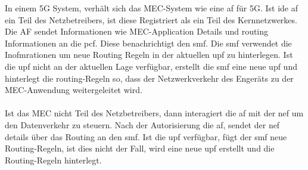 \documentclass[runningheads]{llncs}
\numberwithin{figure}{section}
\begin{document}
In einem 5G System, verhält sich das MEC-System wie eine \acrfull{af} für 5G. Ist ide \acrshort{af} ein Teil des Netzbetreibers, ist diese 
Registriert als ein Teil des Kernnetzwerkes. Die AF sendet Informationen wie MEC-Application Details und routing Informationen 
an die \acrshort{pcf}. Diese benachrichtigt den \acrshort{smf}. Die \acrlong{smf} verwendet die Inofmrationen um neue Routing Regeln in der
aktuellen \acrshort{upf} zu hinterlegen. Ist die \acrshort{upf} nicht an der aktuellen Lage verfügbar, erstellt die \acrshort{smf} eine 
neue \acrshort{upf} und hinterlegt die routing-Regeln so, dass der Netzwerkverkehr des Engeräts zu der MEC-Anwendung weitergeleitet wird.
\\
\\
Ist das MEC nicht Teil des Netzbetreibers, dann interagiert die \acrshort{af} mit der \acrshort{nef} um den Datenverkehr zu steuern.
Nach der Autorisierung die \acrshort{af}, sendet der \acrshort{nef} details über das Routing an den \acrshort{smf}. Ist die \acrshort{upf}
verfügbar, fügt der \acrshort{smf} neue Routing-Regeln, ist dies nicht der Fall, wird eine neue \acrshort{upf} erstellt und die Routing-Regeln
hinterlegt.
\end{document}
